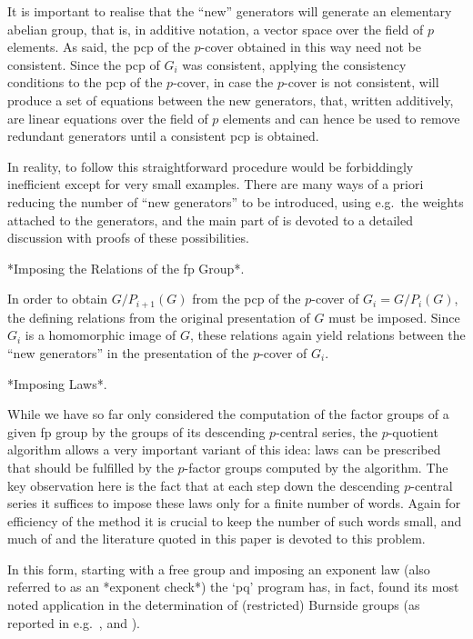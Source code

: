 It is important to realise that the ``new'' generators  will  generate
an elementary abelian group, that is, in additive notation,  a  vector
space over the field  of  $p$  elements.  As  said,  the  pcp  of  the
$p$-cover obtained in this way need not be consistent. Since  the  pcp
of $G_i$ was consistent, applying the consistency  conditions  to  the
pcp of the $p$-cover, in case the $p$-cover is  not  consistent,  will
produce a set of equations between the new generators,  that,  written
additively, are linear equations over the field of  $p$  elements  and
can hence be used to remove redundant generators  until  a  consistent
pcp is obtained.

In  reality,  to  follow  this  straightforward  procedure  would   be
forbiddingly inefficient except for very  small  examples.  There  are
many ways of a priori reducing the number of ``new generators'' to  be
introduced, using e.g.~the weights attached to the generators, and the
main part of \cite{NNN98} is devoted to  a  detailed  discussion  with
proofs of these possibilities.

*Imposing the Relations of the fp Group*.

In order to obtain $G/P_{i+1}(G)$ from the pcp  of  the  $p$-cover  of
$G_i  =  G/P_i(G)$,  the  defining   relations   from   the   original
presentation of $G$ must be imposed.  Since  $G_i$  is  a  homomorphic
image of $G$, these relations again yield relations between the  ``new
generators'' in the presentation of the $p$-cover of $G_i$.

*Imposing Laws*. 

While we have so far only considered the  computation  of  the  factor
groups of a given fp group by the groups of its descending $p$-central
series, the $p$-quotient algorithm allows a very important variant  of
this idea: laws can be prescribed that  should  be  fulfilled  by  the
$p$-factor groups computed by the algorithm. The key observation  here
is the fact that at each step down the descending  $p$-central  series
it suffices to impose these laws only for a finite  number  of  words.
Again for efficiency of the method it is crucial to keep the number of
such words small, and much of \cite{NO96} and the literature quoted in
this paper is devoted to this problem.

In this form, starting with a free group and imposing an exponent  law
(also referred to as an *exponent check*) the  `pq'  program  has,  in
fact, found  its  most  noted  application  in  the  determination  of
(restricted)  Burnside  groups  (as  reported   in   e.g.~\cite{HN80},
\cite{NO96} and \cite{VL90b}).

